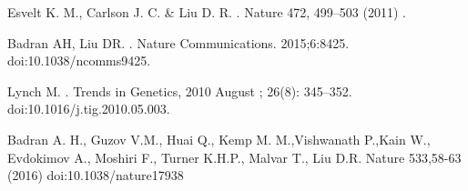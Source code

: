 \documentclass[10pt,letterpaper]{article}
\begin{document}
\nolinenumbers

\begin{thebibliography}{10}

Esvelt K. M., Carlson J. C. \& Liu D. R.
.
\newblock Nature 472, 499–503 (2011) .

Badran AH, Liu DR.
.
\newblock Nature Communications. 2015;6:8425. doi:10.1038/ncomms9425.

Lynch M.
.
\newblock Trends in Genetics, 2010 August ; 26(8): 345–352. doi:10.1016/j.tig.2010.05.003.

  Badran A. H., Guzov V.M., Huai Q., Kemp M. M.,Vishwanath P.,Kain W., Evdokimov A., Moshiri F., Turner K.H.P., Malvar T., Liu D.R.
  \newblock  Nature 533,58-63 (2016) doi:10.1038/nature17938
\end{thebibliography}
\end{document}
